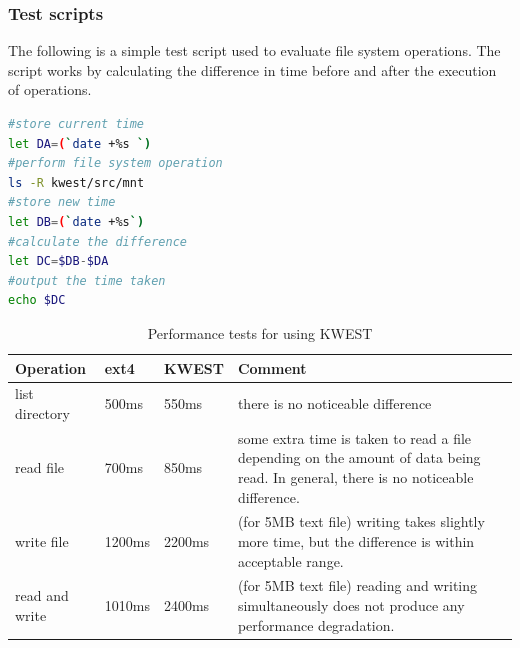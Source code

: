 \subsubsection{Test scripts} 
The following is a simple test script used to evaluate file system operations. The script works by calculating the difference in time before and after the execution of operations.
\begin{lstlisting}[language=bash,frame=single]
#store current time
let DA=(`date +%s `)
#perform file system operation
ls -R kwest/src/mnt
#store new time
let DB=(`date +%s`)
#calculate the difference
let DC=$DB-$DA
#output the time taken
echo $DC
\end{lstlisting}

\begin{table}[h]
\begin{tabular}{|p{2cm}|p{1.5cm}|p{1.5cm}|p{7cm}|}
\hline
\textbf{Operation} & \textbf{ext4} & \textbf{KWEST} & \textbf{Comment} \\ \hline
list directory	&	500ms	&	550ms & there is no noticeable difference \\ \hline
read file	&	700ms & 850ms	& some extra time is taken to read a file depending on the amount of data being read. In general, there is no noticeable difference. \\ \hline
write file	&	1200ms & 2200ms	& (for 5MB text file) writing takes slightly more time, but the difference is within acceptable range. \\ \hline
read and write	&	1010ms & 2400ms & (for 5MB text file) reading and writing simultaneously does not produce any performance degradation. \\
\hline
\end{tabular}
\caption{Performance tests for using KWEST}
\label{performancetests}
\end{table}

